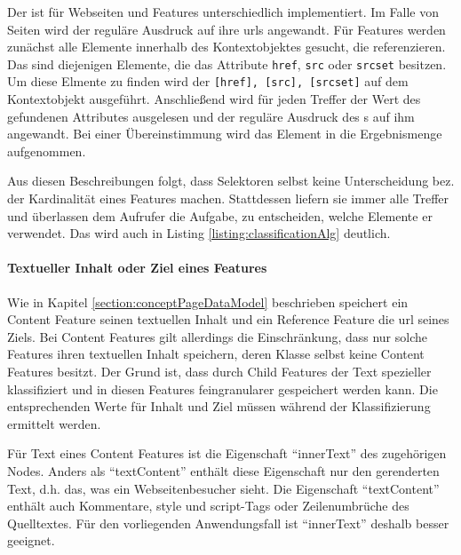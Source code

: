     Der {\urlSelector} ist für Webseiten und Features unterschiedlich implementiert.
    Im Falle von Seiten wird der reguläre Ausdruck auf ihre \glspl{url} angewandt.
    Für Features werden zunächst alle Elemente innerhalb des Kontextobjektes gesucht, die {\resources} referenzieren.
    Das sind diejenigen Elemente, die das Attribute \texttt{href}, \texttt{src} oder \texttt{srcset} besitzen.
    Um diese Elmente zu finden wird der {\cssSelector} \texttt{[href], [src], [srcset]} auf dem Kontextobjekt ausgeführt.
    Anschließend wird für jeden Treffer der Wert des gefundenen Attributes ausgelesen
    und der reguläre Ausdruck des {\urlSelector}s auf ihm angewandt.
    Bei einer Übereinstimmung wird das Element in die Ergebnismenge aufgenommen.

    Aus diesen Beschreibungen folgt, dass Selektoren selbst keine Unterscheidung bez.
    der Kardinalität eines Features machen.
    Stattdessen liefern sie immer alle Treffer und überlassen dem Aufrufer die Aufgabe, zu entscheiden,
    welche Elemente er verwendet.
    Das wird auch in Listing \ref{listing:classificationAlg} deutlich.

    \paragraph{Textueller Inhalt oder Ziel eines Features}
    Wie in Kapitel \ref{section:conceptPageDataModel} beschrieben speichert
    ein Content Feature seinen textuellen Inhalt und ein Reference Feature die \gls{url} seines Ziels.
    Bei Content Features gilt allerdings die Einschränkung, dass nur solche Features ihren textuellen Inhalt speichern,
    deren Klasse selbst keine Content Features besitzt.
    Der Grund ist, dass durch Child Features der Text spezieller klassifiziert und in diesen Features
    feingranularer gespeichert werden kann.
    Die entsprechenden Werte für Inhalt und Ziel müssen während der Klassifizierung ermittelt werden.

    Für Text eines Content Features ist die Eigenschaft "`innerText"' des zugehörigen Nodes.
    Anders als "`textContent"' enthält diese Eigenschaft nur den gerenderten Text, d.h. das, was ein Webseitenbesucher sieht.
    Die Eigenschaft "`textContent"' enthält auch Kommentare, style und script-Tags oder Zeilenumbrüche des Quelltextes.
    Für den vorliegenden Anwendungsfall ist "`innerText"' deshalb besser geeignet.

